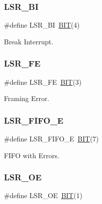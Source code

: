 \subsubsection{\texorpdfstring{L\+S\+R\+\_\+\+BI}{LSR\_BI}}
{\footnotesize\ttfamily \#define L\+S\+R\+\_\+\+BI~\hyperlink{group___serial_ga3a8ea58898cb58fc96013383d39f482c}{B\+IT}(4)}



Break Interrupt. 

\hypertarget{group___serial_gae3f9ccc88c615d1257ad400cf27af7eb}{}\label{group___serial_gae3f9ccc88c615d1257ad400cf27af7eb} 
\subsubsection{\texorpdfstring{L\+S\+R\+\_\+\+FE}{LSR\_FE}}
{\footnotesize\ttfamily \#define L\+S\+R\+\_\+\+FE~\hyperlink{group___serial_ga3a8ea58898cb58fc96013383d39f482c}{B\+IT}(3)}



Framing Error. 

\hypertarget{group___serial_ga17abffa14207797fba6c62875367d085}{}\label{group___serial_ga17abffa14207797fba6c62875367d085} 
\subsubsection{\texorpdfstring{L\+S\+R\+\_\+\+F\+I\+F\+O\+\_\+E}{LSR\_FIFO\_E}}
{\footnotesize\ttfamily \#define L\+S\+R\+\_\+\+F\+I\+F\+O\+\_\+E~\hyperlink{group___serial_ga3a8ea58898cb58fc96013383d39f482c}{B\+IT}(7)}



F\+I\+FO with Errors. 

\hypertarget{group___serial_gae844dd49bb0e0770bcf46ad5bfe20973}{}\label{group___serial_gae844dd49bb0e0770bcf46ad5bfe20973} 
\subsubsection{\texorpdfstring{L\+S\+R\+\_\+\+OE}{LSR\_OE}}
{\footnotesize\ttfamily \#define L\+S\+R\+\_\+\+OE~\hyperlink{group___serial_ga3a8ea58898cb58fc96013383d39f482c}{B\+IT}(1)}




